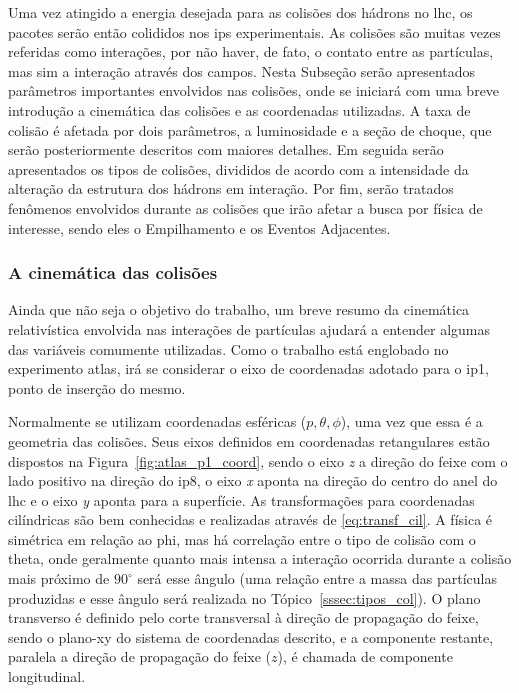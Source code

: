 Uma vez atingido a energia desejada para as colisões dos hádrons no \gls{lhc}, 
os pacotes serão então colididos nos \glspl{ip} experimentais. As colisões são
muitas vezes referidas como interações, por não haver, de fato, o contato
entre as partículas, mas sim a interação através dos campos.
Nesta Subseção serão apresentados parâmetros importantes envolvidos nas
colisões, onde se iniciará com uma breve introdução a cinemática das colisões e as 
coordenadas utilizadas. A taxa de colisão é
afetada por dois parâmetros, a luminosidade e a seção de choque, que serão
posteriormente descritos com maiores detalhes. Em seguida serão
apresentados os tipos de colisões, divididos de acordo com a intensidade da
alteração da estrutura dos hádrons em interação. Por fim, serão tratados
fenômenos envolvidos durante as colisões que irão afetar a busca por física 
de interesse, sendo eles o Empilhamento e os Eventos Adjacentes. 

\subsubsection{A cinemática das colisões}
\label{sssec:cinematica}

Ainda que não seja o objetivo do trabalho, um breve resumo da cinemática
relativística envolvida nas interações de partículas ajudará a entender algumas
das variáveis comumente utilizadas. 
Como o trabalho está englobado no experimento \gls{atlas}, irá se considerar o 
eixo de coordenadas adotado para o \gls{ip}1, ponto de inserção do mesmo. 

Normalmente se utilizam coordenadas esféricas ($p,\theta,\phi$), uma vez que 
essa é a geometria das colisões.
Seus eixos definidos em coordenadas retangulares estão dispostos 
na Figura~\ref{fig:atlas_p1_coord}, sendo o eixo \emph{z} a direção do feixe com
o lado positivo na direção do \gls{ip}8, o eixo
\emph{x} aponta na direção do centro do anel do \gls{lhc} e o eixo \emph{y}
aponta para a superfície.  
As transformações para coordenadas cilíndricas
são bem conhecidas e realizadas através de \ref{eq:transf_cil}.  
A física é simétrica em relação ao \gls{phi}, 
mas há correlação entre o
tipo de colisão com o \gls{theta}, onde geralmente quanto mais intensa a
interação ocorrida durante a colisão mais próximo de $90^\circ$ será esse
ângulo (uma relação entre a massa das partículas produzidas e esse ângulo
será realizada no Tópico~\ref{sssec:tipos_col}). O plano transverso é definido 
pelo corte transversal à direção de propagação do feixe, sendo o plano-xy do
sistema de coordenadas descrito, e a componente restante, paralela a direção de
propagação do feixe ($z$), é chamada de componente longitudinal.

